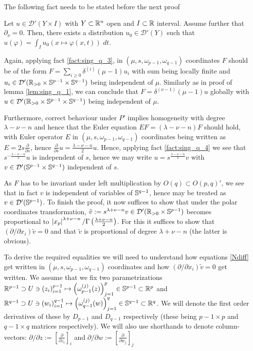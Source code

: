 \documentclass[10pt]{article} %
\newcommand{\D}{\mathcal{D}}
\theoremstyle{definition}
\theoremstyle{remark}
\begin{document}
The following fact needs to be stated before the next proof
\begin{myfact}
	\label{fact:sing_q_4}
	Let $u\in\D'(Y\times I)$ with $Y\subset\mathbb{R}^n$ open and $I\subset\mathbb{R}$ interval. Assume further that
	$\partial_\nu=0$. Then, there exists a distribution $u_0\in\D'(Y)$ such that $u(\varphi)=\int_Iu_0(x\mapsto\varphi(x,t))\;dt$.
\end{myfact}
\begin{myproof}
	Again, applying fact \ref{fact:sing_q_3}, in $(\mu,s,\omega_{p-1},\omega_{q-1})$ coordinates $F$ should be of
	the form $F=\sum_{i\geq0}\delta^{(i)}(\mu-1)u_i$ with sum being locally finite and 
	$u_i\in\D'(\R_{>0}\times\Sp^{p-1}\times
	\Sp^{q-1})$ being independent of $\mu$.
	Similarly as in proof of lemma \ref{lem:sing_q_1},
	we can conclude that $F=\delta^{(\nu-1)}(\mu-1)u$ globally with
	$u\in\D'(\R_{>0}\times\Sp^{p-1}\times
	\Sp^{q-1})$ being independent of $\mu$.

	Furthermore, correct behaviour under $P'$ implies homogeneity with degree
	$\lambda-\nu-n$ and hence that the Euler equation $EF=(\lambda-\nu-n)F$ should hold, with Euler operator $E$
	in $(\mu,s,\omega_{p-1},\omega_{q-1})$ coordinates being written as $E=2s\frac{\partial}{\partial s}$, hence
	$\frac{\partial}{\partial s}u=\frac{\lambda-\nu-n}{2}u$. Hence, applying fact \ref{fact:sing_q_4}
	we see that $s^{-\frac{\lambda-\nu-n}{2}}u$ is independent of $s$, hence we may write $u=s^{\frac{\lambda-\nu-n}{2}}v$
	with $v\in\D'(\Sp^{p-1}\times\Sp^{q-1})$ independent of $s$.

	As $F$ has to be invariant under left multiplication by $O(q)\subset O(p,q)'$, we see that in fact $v$ is independent
	of variables of $\mathbb{S}^{q-1}$, hence may be treated as $v\in\D'(\Sp^{p-1})$.
	To finish the proof, it now 
	suffices to show that under the polar coordinates transformation, $\tilde{v}:=s^{\lambda+\nu-n}v\in
	\D'(\R_{>0}\times\Sp^{p-1})$
	becomes proportional to $\left|x_p\right|^{\lambda+\nu-n}/\Gamma\left( \frac{\lambda+\nu-n}{2} \right)$. For this it suffices
	to show that $(\partial/\partial x_i)\tilde{v}=0$ and that $\tilde{v}$ is proportional of degree $\lambda+\nu-n$
	(the latter is obvious).

	To derive the required equalities we will need to understand how equations \eqref{Ndiff} get written in $(\mu,s,\omega_{p-1},
	\omega_{q-1})$ coordinates and how $(\partial/\partial x_i)\tilde{v}=0$ get written. We assume that we fix two 
	parametrizations $\mathbb{R}^{p-1}\supset U\ni\left( z_i \right)_{i=1}^{p-1}\mapsto\left( \omega_{p-1}^{(j)}(z) \right)_{j=1}^{p}\in
	\mathbb{S}^{p-1}\subset\mathbb{R}^p$ and 
	$\mathbb{R}^{q-1}\supset U\ni\left( w_i \right)_{i=1}^{q-1}\mapsto\left( \omega_{q-1}^{(j)}(w) \right)_{j=1}^{q}\in
	\mathbb{S}^{q-1}\subset\mathbb{R}^q$. We will denote the first order derivatives of these by $D_{p-1}$ and $D_{q-1}$ respectively
	(these being $p-1\times p$ and $q-1\times q$ matrices respectively). We will also use shorthands to denote column-vectors:
	$\partial/\partial z:=\left[ \frac{\partial}{\partial z_i} \right]_i$ and 
	$\partial/\partial w:=\left[ \frac{\partial}{\partial w_j} \right]_j$


\end{myproof}
\end{document}
